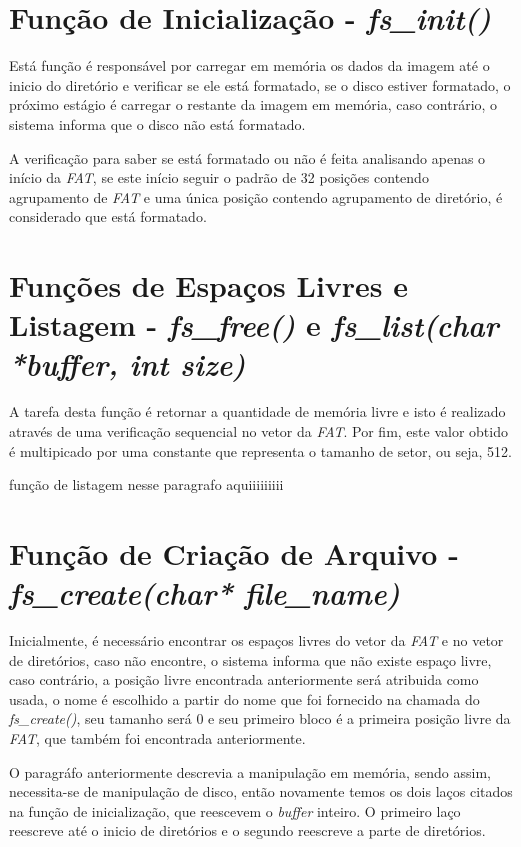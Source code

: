 \documentclass[11pt]{article}
\begin{document}
\section{Função de Inicialização -  \textit{fs\_init()}}
\par
Está função é responsável por carregar em memória os dados da imagem até o inicio do diretório e verificar se ele está formatado, se o disco estiver formatado, o próximo estágio é carregar o restante da imagem em memória, caso contrário, o sistema informa que o disco não está formatado.
\par
A verificação para saber se está formatado ou não é feita analisando apenas o início da \textit{FAT}, se este início seguir o padrão de 32 posições contendo agrupamento de \textit{FAT} e uma única posição contendo agrupamento de diretório, é considerado que está formatado.

\section{Funções de Espaços Livres e Listagem -  \textit{fs\_free()} e  \textit{fs\_list(char *buffer, int size)}}
\par
A tarefa desta função é retornar a quantidade de memória livre e isto é realizado através de uma verificação sequencial no vetor da \textit{FAT}. Por fim, este valor obtido é multipicado por uma constante que representa o tamanho de setor, ou seja, 512.
\par
função de listagem nesse paragrafo aquiiiiiiiii

\section{Função de Criação de Arquivo - \textit{fs\_create(char* file\_name)}}
\par
Inicialmente, é necessário encontrar os espaços livres do vetor da \textit{FAT} e no vetor de diretórios, caso não encontre, o sistema informa que não existe espaço livre, caso contrário, a posição livre encontrada anteriormente será atribuida como usada, o nome é escolhido a partir do nome que foi fornecido na chamada do \textit{fs\_create()}, seu tamanho será 0 e seu primeiro bloco é a primeira posição livre da \textit{FAT}, que também foi encontrada anteriormente.
\par
O paragráfo anteriormente descrevia a manipulação em memória, sendo assim, necessita-se de manipulação de disco, então novamente temos os dois laços citados na função de inicialização, que reescevem o \textit{buffer} inteiro. O primeiro laço reescreve até o inicio de diretórios e o segundo reescreve a parte de diretórios.
\end{document}
